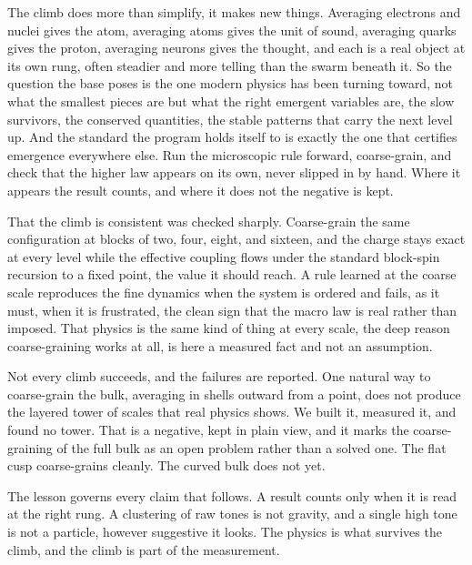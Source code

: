The climb does more than simplify, it makes new things. Averaging electrons and nuclei gives the atom, averaging atoms gives the unit of sound, averaging quarks gives the proton, averaging neurons gives the thought, and each is a real object at its own rung, often steadier and more telling than the swarm beneath it. So the question the base poses is the one modern physics has been turning toward, not what the smallest pieces are but what the right emergent variables are, the slow survivors, the conserved quantities, the stable patterns that carry the next level up. And the standard the program holds itself to is exactly the one that certifies emergence everywhere else. Run the microscopic rule forward, coarse-grain, and check that the higher law appears on its own, never slipped in by hand. Where it appears the result counts, and where it does not the negative is kept.

That the climb is consistent was checked sharply. Coarse-grain the same configuration at blocks of two, four, eight, and sixteen, and the charge stays exact at every level while the effective coupling flows under the standard block-spin recursion to a fixed point, the value it should reach. A rule learned at the coarse scale reproduces the fine dynamics when the system is ordered and fails, as it must, when it is frustrated, the clean sign that the macro law is real rather than imposed. That physics is the same kind of thing at every scale, the deep reason coarse-graining works at all, is here a measured fact and not an assumption.

Not every climb succeeds, and the failures are reported. One natural way to coarse-grain the bulk, averaging in shells outward from a point, does not produce the layered tower of scales that real physics shows. We built it, measured it, and found no tower. \cite{pollard2026vibetest} That is a negative, kept in plain view, and it marks the coarse-graining of the full bulk as an open problem rather than a solved one. The flat cusp coarse-grains cleanly. The curved bulk does not yet.

The lesson governs every claim that follows. A result counts only when it is read at the right rung. A clustering of raw tones is not gravity, and a single high tone is not a particle, however suggestive it looks. The physics is what survives the climb, and the climb is part of the measurement.
